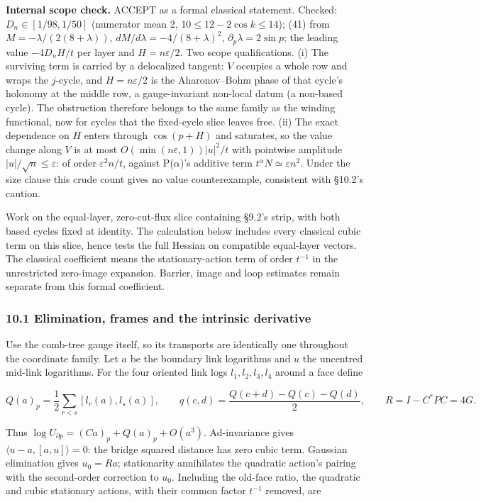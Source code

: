 \documentclass[11pt,a4paper]{article}
\begin{document}
\textbf{Internal scope check.} ACCEPT as a formal classical statement.
Checked: \(D_n\in[1/98,1/50]\) (numerator mean 2,
\(10\le12-2\cos k\le14\)); (41) from \(M=-\lambda/(2(8+\lambda))\),
\(dM/d\lambda=-4/(8+\lambda)^2\), \(\partial_p\lambda=2\sin p\); the
leading value \(-4D_nH/t\) per layer and \(H=n\varepsilon/2\). Two scope
qualifications. (i) The surviving term is carried by a delocalized
tangent: \(V\) occupies a whole row and wraps the \(j\)-cycle, and
\(H=n\varepsilon/2\) is the Aharonov--Bohm phase of that cycle's
holonomy at the middle row, a gauge-invariant non-local datum (a
non-based cycle). The obstruction therefore belongs to the same family
as the winding functional, now for cycles that the fixed-cycle slice
leaves free. (ii) The exact dependence on \(H\) enters through
\(\cos(p+H)\) and saturates, so the value change along \(V\) is at most
\(O(\min(n\varepsilon,1))|u|^2/t\) with pointwise amplitude
\(|u|/\sqrt n\le\varepsilon\): of order \(\varepsilon^2n/t\), against
P(\(\alpha\))'s additive term \(t^\alpha N\simeq\varepsilon n^2\). Under
the size clause this crude count gives no value counterexample,
consistent with §10.2's caution.

Work on the equal-layer, zero-cut-flux slice containing §9.2's strip,
with both based cycles fixed at identity. The calculation below includes
every classical cubic term on this slice, hence tests the full Hessian
on compatible equal-layer vectors. The classical coefficient means the
stationary-action term of order \(t^{-1}\) in the unrestricted
zero-image expansion. Barrier, image and loop estimates remain separate
from this formal coefficient.

\hypertarget{elimination-frames-and-the-intrinsic-derivative}{%
\subsubsection{10.1 Elimination, frames and the intrinsic
derivative}\label{elimination-frames-and-the-intrinsic-derivative}}

Use the comb-tree gauge itself, so its transports are identically one
throughout the coordinate family. Let \(a\) be the boundary link
logarithms and \(u\) the uncentred mid-link logarithms. For the four
oriented link logs \(l_1,l_2,l_3,l_4\) around a face define

\[Q(a)_p=\frac12\sum_{r<s}[l_r(a),l_s(a)],\qquad
q(c,d)=\frac{Q(c+d)-Q(c)-Q(d)}2,\qquad
R=I-C^*PC=4G.\tag{36}\]

Thus \(\log U_{\partial p}=(Ca)_p+Q(a)_p+O(a^3)\). Ad-invariance gives
\(\langle u-a,[a,u]\rangle=0\): the bridge squared distance has zero
cubic term. Gaussian elimination gives \(u_0=Ra\); stationarity
annihilates the quadratic action's pairing with the second-order
correction to \(u_0\). Including the old-face ratio, the quadratic and
cubic stationary actions, with their common factor \(t^{-1}\) removed,
are
\end{document}
